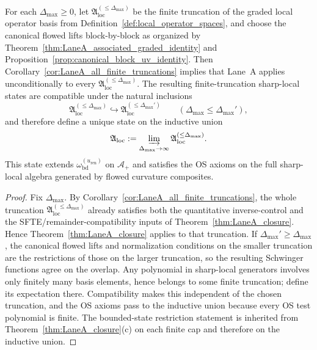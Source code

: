 \begin{corollary}\label{cor:LaneA_full_scope}
For each $\Delta_{\max}\ge 0$, let $\mathfrak A_{\mathrm{loc}}^{(\le \Delta_{\max})}$ be the finite truncation of the graded local operator basis from Definition~\ref{def:local_operator_spaces},
and choose the canonical flowed lifts block-by-block as organized by Theorem~\ref{thm:LaneA_associated_graded_identity} and Proposition~\ref{prop:canonical_block_uv_identity}.
Then Corollary~\ref{cor:LaneA_all_finite_truncations} implies that Lane~A applies unconditionally to every $\mathfrak A_{\mathrm{loc}}^{(\le \Delta_{\max})}$.
The resulting finite-truncation sharp-local states are compatible under the natural inclusions
\[
\mathfrak A_{\mathrm{loc}}^{(\le \Delta_{\max})}\hookrightarrow \mathfrak A_{\mathrm{loc}}^{(\le \Delta_{\max}')}
\qquad (\Delta_{\max}\le \Delta_{\max}'),
\]
and therefore define a unique state on the inductive union
\[
\mathfrak A_{\mathrm{loc}}:=\varinjlim_{\Delta_{\max}\to\infty}\mathfrak A_{\mathrm{loc}}^{(\le \Delta_{\max})}.
\]
This state extends $\omega_{\mathrm{bd}}^{(u_{\mathrm{ren}})}$ on $\mathcal A_+$ and satisfies the OS axioms on the full sharp-local algebra generated by flowed curvature composites.
\end{corollary}

\begin{proof}
Fix $\Delta_{\max}$.
By Corollary~\ref{cor:LaneA_all_finite_truncations}, the whole truncation $\mathfrak A_{\mathrm{loc}}^{(\le \Delta_{\max})}$ already satisfies both the quantitative inverse-control and the SFTE/remainder-compatibility inputs of Theorem~\ref{thm:LaneA_closure}.
Hence Theorem~\ref{thm:LaneA_closure} applies to that truncation.
If $\Delta_{\max}'\ge \Delta_{\max}$, the canonical flowed lifts and normalization conditions on the smaller truncation are the restrictions of those on the larger truncation,
so the resulting Schwinger functions agree on the overlap.
Any polynomial in sharp-local generators involves only finitely many basis elements, hence belongs to some finite truncation; define its expectation there.
Compatibility makes this independent of the chosen truncation, and the OS axioms pass to the inductive union because every OS test polynomial is finite.
The bounded-state restriction statement is inherited from Theorem~\ref{thm:LaneA_closure}(c) on each finite cap and therefore on the inductive union.
\end{proof}


